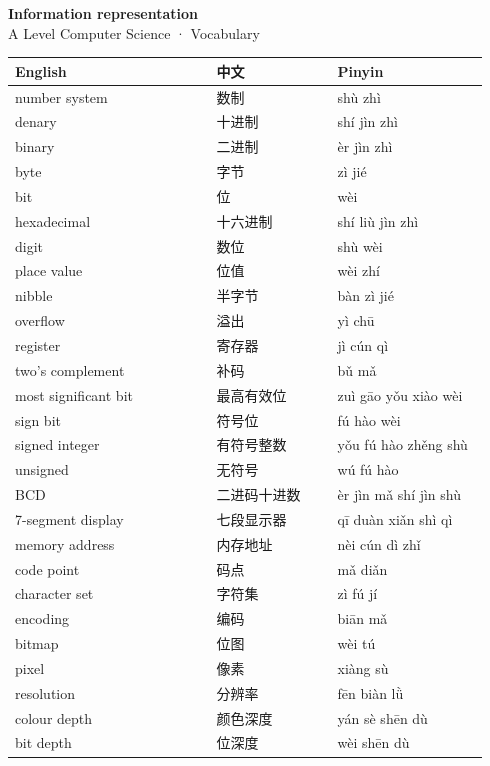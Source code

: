 \documentclass[11pt]{article}
\begin{document}
\begin{center}
  {\LARGE\bfseries Information representation}\\[0.35em]
  {\large A Level Computer Science · Vocabulary}
\end{center}
\vspace{0.6em}

\begin{longtable}{@{}p{0.40\linewidth}p{0.24\linewidth}p{0.30\linewidth}@{}}
\toprule
\textbf{English} & \textbf{中文} & \textbf{Pinyin} \\
\midrule
\endhead
\bottomrule
\endlastfoot
number system & 数制 & shù zhì \\
denary & 十进制 & shí jìn zhì \\
binary & 二进制 & èr jìn zhì \\
byte & 字节 & zì jié \\
bit & 位 & wèi \\
hexadecimal & 十六进制 & shí liù jìn zhì \\
digit & 数位 & shù wèi \\
place value & 位值 & wèi zhí \\
nibble & 半字节 & bàn zì jié \\
overflow & 溢出 & yì chū \\
register & 寄存器 & jì cún qì \\
two's complement & 补码 & bǔ mǎ \\
most significant bit & 最高有效位 & zuì gāo yǒu xiào wèi \\
sign bit & 符号位 & fú hào wèi \\
signed integer & 有符号整数 & yǒu fú hào zhěng shù \\
unsigned & 无符号 & wú fú hào \\
BCD & 二进码十进数 & èr jìn mǎ shí jìn shù \\
7-segment display & 七段显示器 & qī duàn xiǎn shì qì \\
memory address & 内存地址 & nèi cún dì zhǐ \\
code point & 码点 & mǎ diǎn \\
character set & 字符集 & zì fú jí \\
encoding & 编码 & biān mǎ \\
bitmap & 位图 & wèi tú \\
pixel & 像素 & xiàng sù \\
resolution & 分辨率 & fēn biàn lǜ \\
colour depth & 颜色深度 & yán sè shēn dù \\
bit depth & 位深度 & wèi shēn dù \\

\end{longtable}
\end{document}
